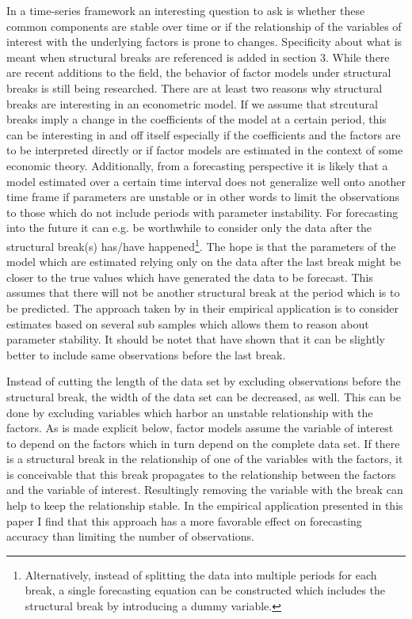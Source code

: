 \documentclass[12pt]{article}
\begin{document}
In a time-series framework an interesting question to ask is whether these common components are stable over time or if the relationship of the variables of interest with the underlying factors is prone to changes. Specificity about what is meant when structural breaks are referenced is added in section 3. While there are recent additions to the field, the behavior of factor models under structural breaks is still being researched. There are at least two reasons why structural breaks are interesting in an econometric model. If we assume that strcutural breaks imply a change in the coefficients of the model at a certain period, this can be interesting in and off itself especially if the coefficients and the factors are to be interpreted directly or if factor models are estimated in the context of some economic theory. Additionally, from a forecasting perspective it is likely that a model estimated over a certain time interval does not generalize well onto another time frame if parameters are unstable or in other words to limit the observations to those which do not include periods with parameter instability. For forecasting into the future it can e.g. be worthwhile to consider only the data after the structural break(s) has/have happened\footnote{Alternatively, instead of splitting the data into multiple periods for each break, a single forecasting equation can be constructed which includes the structural break by introducing a dummy variable.}. The hope is that the parameters of the model which are estimated relying only on the data after the last break might be closer to the true values which have generated the data to be forecast. This assumes that there will not be another structural break at the period which is to be predicted. The approach taken by \citet{bai2008forecasting} in their empirical application is to consider estimates based on several sub samples which allows them to reason about parameter stability.
It should be notet that \citet{pesaran2007selection} have shown that it can be slightly better to include same observations before the last break. 

Instead of cutting the length of the data set by excluding observations before the structural break, the width of the data set can be decreased, as well. This can be done by excluding variables which harbor an unstable relationship with the factors. As is made explicit below, factor models assume the variable of interest to depend on the factors which in turn depend on the complete data set. If there is a structural break in the relationship of one of the variables with the factors, it is conceivable that this break propagates to the relationship between the factors and the variable of interest. Resultingly removing the variable with the break can help to keep the relationship stable. In the empirical application presented in this paper I find that this approach has a more favorable effect on forecasting accuracy than limiting the number of observations.
\end{document}
